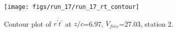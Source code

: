 \begin{figure}[H]
\centering
\texttt{[image: figs/run\_17/run\_17\_rt\_contour]}
\caption{Contour plot of $\overline{r^\prime t^\prime}$ at $z/c$=6.97, $V_{free}$=27.03, station 2.}
\label{fig:run_17_rt_contour}
\end{figure}


